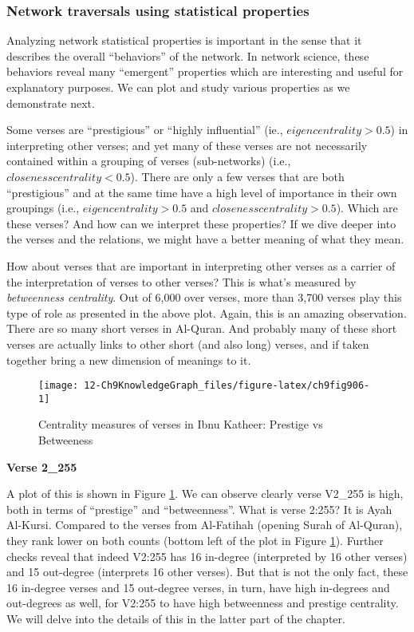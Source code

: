 \documentclass[
]{article}
\begin{document}
\hypertarget{network-traversals-using-statistical-properties}{%
\subsubsection{Network traversals using statistical properties}\label{network-traversals-using-statistical-properties}}

Analyzing network statistical properties is important in the sense that it describes the overall ``behaviors'' of the network. In network science, these behaviors reveal many ``emergent'' properties which are interesting and useful for explanatory purposes. We can plot and study various properties as we demonstrate next.

Some verses are ``prestigious'' or ``highly influential'' (ie., \(eigen centrality > 0.5\)) in interpreting other verses; and yet many of these verses are not necessarily contained within a grouping of verses (sub-networks) (i.e., \(closeness centrality < 0.5\)). There are only a few verses that are both ``prestigious'' and at the same time have a high level of importance in their own groupings (i.e., \(eigen centrality > 0.5\) and \(closeness centrality > 0.5\)). Which are these verses? And how can we interpret these properties? If we dive deeper into the verses and the relations, we might have a better meaning of what they mean.

How about verses that are important in interpreting other verses as a carrier of the interpretation of verses to other verses? This is what's measured by \emph{betweenness centrality}. Out of 6,000 over verses, more than 3,700 verses play this type of role as presented in the above plot. Again, this is an amazing observation. There are so many short verses in Al-Quran. And probably many of these short verses are actually links to other short (and also long) verses, and if taken together bring a new dimension of meanings to it.

\begin{figure}

{\centering \texttt{[image: 12-Ch9KnowledgeGraph\_files/figure-latex/ch9fig906-1]} 

}

\caption{Centrality measures of verses in Ibnu Katheer: Prestige vs Betweeness}\label{fig:ch9fig906}
\end{figure}

\textbf{Verse 2\_255}

A plot of this is shown in Figure \ref{fig:ch9fig906}. We can observe clearly verse V2\_255 is high, both in terms of ``prestige'' and ``betweenness''. What is verse 2:255? It is Ayah Al-Kursi. Compared to the verses from Al-Fatihah (opening Surah of Al-Quran), they rank lower on both counts (bottom left of the plot in Figure \ref{fig:ch9fig906}). Further checks reveal that indeed V2:255 has 16 in-degree (interpreted by 16 other verses) and 15 out-degree (interprets 16 other verses). But that is not the only fact, these 16 in-degree verses and 15 out-degree verses, in turn, have high in-degrees and out-degrees as well, for V2:255 to have high betweenness and prestige centrality. We will delve into the details of this in the latter part of the chapter.
\end{document}

